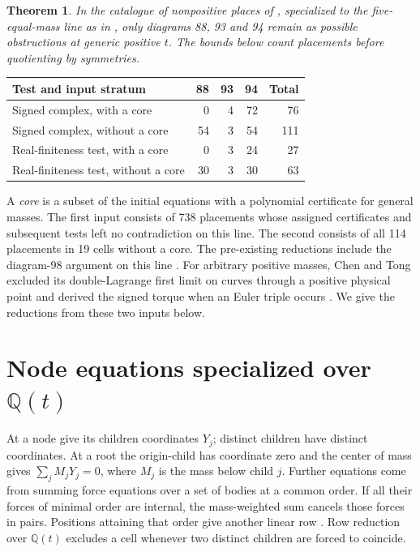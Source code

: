 \documentclass[11pt]{article}
\newtheorem{theorem}{Theorem}
\newcommand{\QQ}{\mathbb Q}
\begin{document}
\newpage
\begin{theorem}\label{main}
In the catalogue of nonpositive places of \cite{Tomar}, specialized to the five-equal-mass line as in \cite{Prior}, only diagrams 88, 93 and 94 remain as possible obstructions at generic positive $t$. The bounds below count placements before quotienting by symmetries.
\end{theorem}
\begin{center}
\begin{tabular}{lrrrr}
\toprule
Test and input stratum & 88 & 93 & 94 & Total\\
\midrule
Signed complex, with a core & 0 & 4 & 72 & 76\\
Signed complex, without a core & 54 & 3 & 54 & 111\\
Real-finiteness test, with a core & 0 & 3 & 24 & 27\\
Real-finiteness test, without a core & 30 & 3 & 30 & 63\\
\bottomrule
\end{tabular}
\end{center}
A \emph{core} is a subset of the initial equations with a polynomial certificate for general masses. The first input consists of 738 placements whose assigned certificates and subsequent tests left no contradiction on this line. The second consists of all 114 placements in 19 cells without a core. The pre-existing reductions include the diagram-98 argument on this line \cite{Prior}. For arbitrary positive masses, Chen and Tong excluded its double-Lagrange first limit on curves through a positive physical point and derived the signed torque when an Euler triple occurs \cite[Prop.~5.21, eq.~(113)]{CT}. We give the reductions from these two inputs below.

\section{Node equations specialized over $\QQ(t)$}
At a node give its children coordinates $Y_j$; distinct children have distinct coordinates. At a root the origin-child has coordinate zero and the center of mass gives $\sum_j M_jY_j=0$, where $M_j$ is the mass below child $j$. Further equations come from summing force equations over a set of bodies at a common order. If all their forces of minimal order are internal, the mass-weighted sum cancels those forces in pairs. Positions attaining that order give another linear row \cite[Lemma 9.1]{Tomar}. Row reduction over $\QQ(t)$ excludes a cell whenever two distinct children are forced to coincide.
\end{document}
